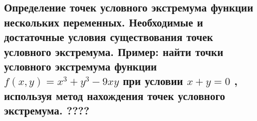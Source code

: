 {
\subsection{ Определение точек условного экстремума функции нескольких переменных. Необходимые и достаточные   условия существования точек условного экстремума. Пример: найти точки условного экстремума функции \( f(x,y) = x^3 + y^3 - 9xy\)   при условии \(x + y = 0\)  ,  используя метод нахождения точек условного экстремума. ????}
}